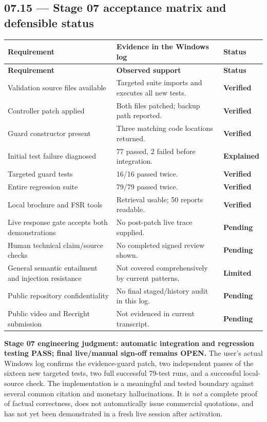 \documentclass[11pt,a4paper]{article}
\begin{document}
\subsection{07.15 --- Stage 07 acceptance matrix and defensible status}
\begin{longtable}{@{}L{53mm}L{56mm}L{36mm}@{}}
\toprule
\textbf{Requirement} & \textbf{Evidence in the Windows log} & \textbf{Status}\\\midrule\endfirsthead
\toprule\textbf{Requirement} & \textbf{Observed support} & \textbf{Status}\\\midrule\endhead
Validation source files available & Targeted suite imports and executes all new tests. & \textbf{Verified}\\
Controller patch applied & Both files patched; backup path reported. & \textbf{Verified}\\
Guard constructor present & Three matching code locations returned. & \textbf{Verified}\\
Initial test failure diagnosed & 77 passed, 2 failed before integration. & \textbf{Explained}\\
Targeted guard tests & 16/16 passed twice. & \textbf{Verified}\\
Entire regression suite & 79/79 passed twice. & \textbf{Verified}\\
Local brochure and FSR tools & Retrieval usable; 50 reports readable. & \textbf{Verified}\\
Live response gate accepts both demonstrations & No post-patch live trace supplied. & \textbf{Pending}\\
Human technical claim/source checks & No completed signed review shown. & \textbf{Pending}\\
General semantic entailment and injection resistance & Not covered comprehensively by current patterns. & \textbf{Limited}\\
Public repository confidentiality & No final staged/history audit in this log. & \textbf{Pending}\\
Public video and Recright submission & Not evidenced in current transcript. & \textbf{Pending}\\
\bottomrule
\end{longtable}

\begin{keybox}
\textbf{Stage 07 engineering judgment: automatic integration and regression testing PASS; final live/manual sign-off remains OPEN.} The user's actual Windows log confirms the evidence-guard patch, two independent passes of the sixteen new targeted tests, two full successful 79-test runs, and a successful local-source check. The implementation is a meaningful and tested boundary against several common citation and monetary hallucinations. It is \emph{not} a complete proof of factual correctness, does not automatically issue commercial quotations, and has not yet been demonstrated in a fresh live session after activation.
\end{keybox}
\end{document}
